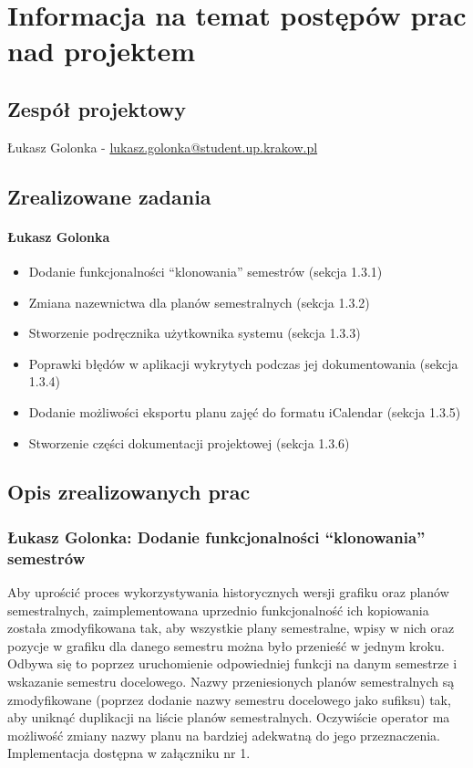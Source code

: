 \documentclass[12pt,a4paper,oneside]{article}
\theoremstyle{definition}
\numberwithin{equation}{section}
\begin{document}
\tableofcontents


\newpage

\section{Informacja na temat postępów prac nad projektem}
\subsection{Zespół projektowy}
Łukasz Golonka - \href{mailto:lukasz.golonka@student.up.krakow.pl}{lukasz.golonka@student.up.krakow.pl}
\subsection{Zrealizowane zadania}
\paragraph{Łukasz Golonka}
\begin{itemize}
\item Dodanie funkcjonalności ``klonowania'' semestrów (sekcja 1.3.1)
\item Zmiana nazewnictwa dla planów semestralnych (sekcja 1.3.2)
\item Stworzenie podręcznika użytkownika systemu (sekcja 1.3.3)
\item Poprawki błędów w aplikacji wykrytych podczas jej dokumentowania (sekcja 1.3.4)
\item Dodanie możliwości eksportu planu zajęć do formatu iCalendar (sekcja 1.3.5)
\item Stworzenie części dokumentacji projektowej (sekcja 1.3.6)
\end{itemize}

\subsection {Opis zrealizowanych prac}
\subsubsection{Łukasz Golonka: Dodanie funkcjonalności ``klonowania'' semestrów}
Aby uprościć proces wykorzystywania historycznych wersji grafiku oraz planów semestralnych, zaimplementowana uprzednio funkcjonalność ich kopiowania została zmodyfikowana tak, aby wszystkie plany semestralne, wpisy w nich oraz pozycje w grafiku dla danego semestru można było przenieść w jednym kroku.
Odbywa się to poprzez uruchomienie odpowiedniej funkcji na danym semestrze i wskazanie semestru docelowego.
Nazwy przeniesionych planów semestralnych są zmodyfikowane (poprzez dodanie nazwy semestru docelowego jako sufiksu) tak, aby uniknąć duplikacji na liście planów semestralnych.
Oczywiście operator ma możliwość zmiany nazwy planu na bardziej adekwatną do jego przeznaczenia.
Implementacja dostępna w załączniku nr 1.
\end{document}
